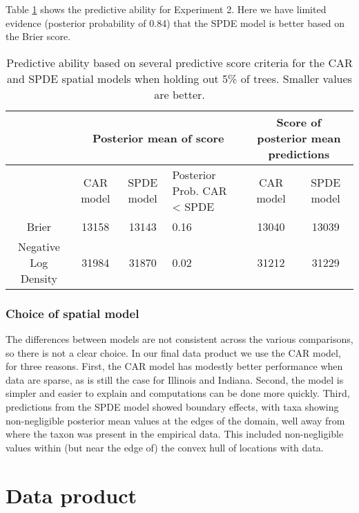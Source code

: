 \documentclass[12pt]{article}\usepackage[]{graphicx}\usepackage[]{color}
\providecommand{\tabularnewline}{\\}
\begin{document}
Table \ref{tab:score_tree} shows the predictive ability for Experiment
2. Here we have limited evidence (posterior probability of 0.84) that
the SPDE model is better based on the Brier score.



\begin{table}
\caption{Predictive ability based on several predictive score criteria for
the CAR and SPDE spatial models when holding out 5\% of trees. Smaller
values are better.}


\begin{tabular}{|c|c|c|>{\centering}p{3cm}|c|c|}
\hline 
 &
\multicolumn{3}{c|}{{\small{Posterior mean of score}}} &
\multicolumn{2}{c|}{{\small{Score of posterior mean predictions}}}\tabularnewline
\hline 
\hline 
 &
{\small{CAR model}} &
{\small{SPDE model}} &
{\small{Posterior Prob. CAR < SPDE}} &
{\small{CAR model}} &
{\small{SPDE model}}\tabularnewline
\hline 
{\small{Brier}} &
{\small{13158}} &
{\small{13143}} &
{\small{0.16}} &
{\small{13040}} &
{\small{13039}}\tabularnewline
\hline 
{\small{Negative Log Density}} &
{\small{31984}} &
{\small{31870}} &
{\small{0.02}} &
{\small{31212}} &
{\small{31229}}\tabularnewline
\hline 
\end{tabular}

\label{tab:score_tree}
\end{table}



\subsubsection{Choice of spatial model}

The differences between models are not consistent across the various
comparisons, so there is not a clear choice. In our final data product
we use the CAR model, for three reasons. First, the CAR model has
modestly better performance when data are sparse, as is still the
case for Illinois and Indiana. Second, the model is simpler and easier
to explain and computations can be done more quickly. Third, predictions
from the SPDE model showed boundary effects, with taxa showing non-negligible
posterior mean values at the edges of the domain, well away from where
the taxon was present in the empirical data. This included non-negligible
values within (but near the edge of) the convex hull of locations
with data. 


\section{Data product}
\end{document}
